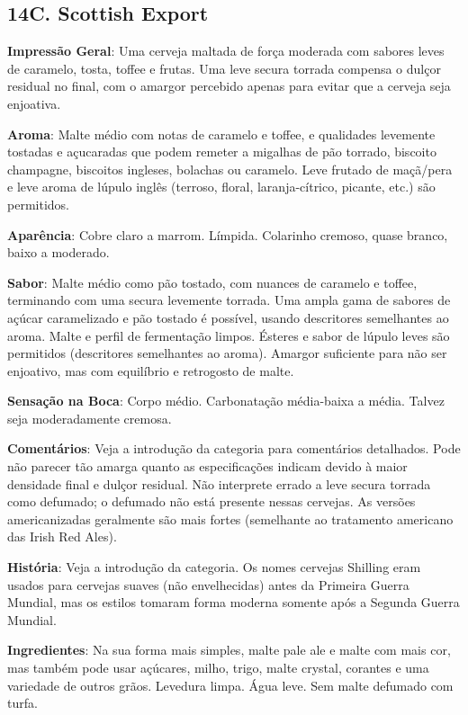 \subsection*{14C. Scottish Export}
\textbf{Impressão Geral}: Uma cerveja maltada de força moderada com sabores leves de caramelo, tosta, toffee e frutas. Uma leve secura torrada compensa o dulçor residual no final, com o amargor percebido apenas para evitar que a cerveja seja enjoativa.

\textbf{Aroma}: Malte médio com notas de caramelo e toffee, e qualidades levemente tostadas e açucaradas que podem remeter a migalhas de pão torrado, biscoito champagne, biscoitos ingleses, bolachas ou caramelo. Leve frutado de maçã/pera e leve aroma de lúpulo inglês (terroso, floral, laranja-cítrico, picante, etc.) são permitidos.

\textbf{Aparência}: Cobre claro a marrom. Límpida. Colarinho cremoso, quase branco, baixo a moderado.

\textbf{Sabor}: Malte médio como pão tostado, com nuances de caramelo e toffee, terminando com uma secura levemente torrada. Uma ampla gama de sabores de açúcar caramelizado e pão tostado é possível, usando descritores semelhantes ao aroma. Malte e perfil de fermentação limpos. Ésteres e sabor de lúpulo leves são permitidos (descritores semelhantes ao aroma). Amargor suficiente para não ser enjoativo, mas com equilíbrio e retrogosto de malte.

\textbf{Sensação na Boca}: Corpo médio. Carbonatação média-baixa a média. Talvez seja moderadamente cremosa.

\textbf{Comentários}: Veja a introdução da categoria para comentários detalhados. Pode não parecer tão amarga quanto as especificações indicam devido à maior densidade final e dulçor residual. Não interprete errado a leve secura torrada como defumado; o defumado não está presente nessas cervejas. As versões americanizadas geralmente são mais fortes (semelhante ao tratamento americano das Irish Red Ales).

\textbf{História}: Veja a introdução da categoria. Os nomes cervejas Shilling eram usados para cervejas suaves (não envelhecidas) antes da Primeira Guerra Mundial, mas os estilos tomaram forma moderna somente após a Segunda Guerra Mundial.

\textbf{Ingredientes}: Na sua forma mais simples, malte pale ale e malte com mais cor, mas também pode usar açúcares, milho, trigo, malte crystal, corantes e uma variedade de outros grãos. Levedura limpa. Água leve. Sem malte defumado com turfa.

